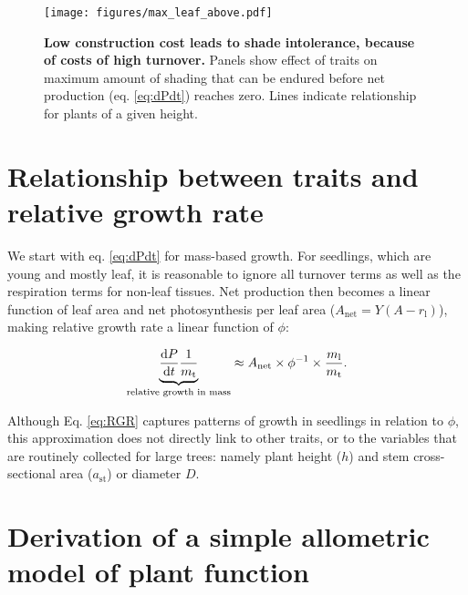 \documentclass[12pt, a4paper]{article}
\begin{document}
\newpage

\begin{figure}[htbp]
\centering
\texttt{[image: figures/max\_leaf\_above.pdf]}
\caption{\textbf{Low construction cost leads to shade intolerance,
because of costs of high turnover.} Panels show effect of traits on
maximum amount of shading that can be endured before net production (eq.
\ref{eq:dPdt}) reaches zero. Lines indicate relationship for plants of a
given height. \label{f-wplcp}}
\end{figure}




\newpage
\begin{appendices}
\setcounter{figure}{0} \renewcommand{\thefigure}{S\arabic{figure}}
\setcounter{table}{0} \renewcommand{\thetable}{S\arabic{table}}


\section{Relationship between traits and relative growth rate} \label{app:traits-RGR}

We start with eq. \ref{eq:dPdt} for mass-based growth. For seedlings, which are
young and mostly leaf, it is reasonable to ignore all turnover terms as
well as the respiration terms for non-leaf tissues. Net production then
becomes a linear function of leaf area and net photosynthesis per leaf
area ($A_\textrm{net} = Y(A - r_\textrm{l})$), making relative growth
rate a linear function of $\phi$:

\begin{equation}\label{eq:RGR}
\underbrace{\strut\frac{\textrm{d}P}{\textrm{d}t}\frac{1}{m_\textrm{t}}}_\textrm{relative growth in mass}  \approx A_\textrm{net} \times \phi^{-1} \times \frac{m_\textrm{l}}{m_\textrm{t}}. \end{equation}

Although Eq. \ref{eq:RGR} captures patterns of growth in seedlings in
relation to $\phi$\citep{wright_cross-2000}, this
approximation does not directly link to other traits, or to the
variables that are routinely collected for large trees: namely plant
height ($h$) and stem cross-sectional area ($a_\textrm{st}$) or
diameter $D$.


\section{Derivation of a simple allometric model of plant
function}\label{app:func_balance}


\end{appendices}
\end{document}
